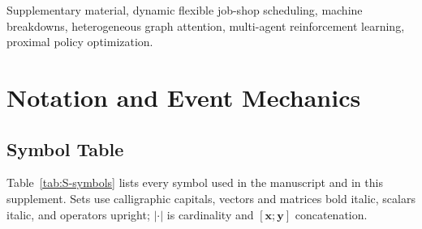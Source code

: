 \documentclass[conference]{IEEEtran}
\theoremstyle{remark}
\begin{document}
\maketitle

\begin{abstract}
This supplement documents the complete formulation, implementation, convergence analysis, and experimental statistics of CPR-PPO, including TRAE, CSAR, PCD, CPR-S, and KACP. Section~I fixes the notation and the event mechanics. Section~II details the heterogeneous graph and the typed attention encoder. Section~III states the decision process, the decoder, and the release properties, Section~IV documents training, and Section~V proves convergence. Section~VI derives the time and memory complexity, Section~VII reports the per-unit and paired statistics, and Section~VIII states the reproducibility protocol. Equation, table, figure, and algorithm numbers carry the prefix S and are distinct from those of the manuscript.
\end{abstract}

\begin{IEEEkeywords}
Supplementary material, dynamic flexible job-shop scheduling, machine breakdowns, heterogeneous graph attention, multi-agent reinforcement learning, proximal policy optimization.
\end{IEEEkeywords}

\section{Notation and Event Mechanics}
\label{sec:S-notation}

\subsection{Symbol Table}
\label{sec:S-symbols}

Table~\ref{tab:S-symbols} lists every symbol used in the manuscript and in this supplement. Sets use calligraphic capitals, vectors and matrices bold italic, scalars italic, and operators upright; $|\cdot|$ is cardinality and $[\bm{x};\bm{y}]$ concatenation.
\end{document}
